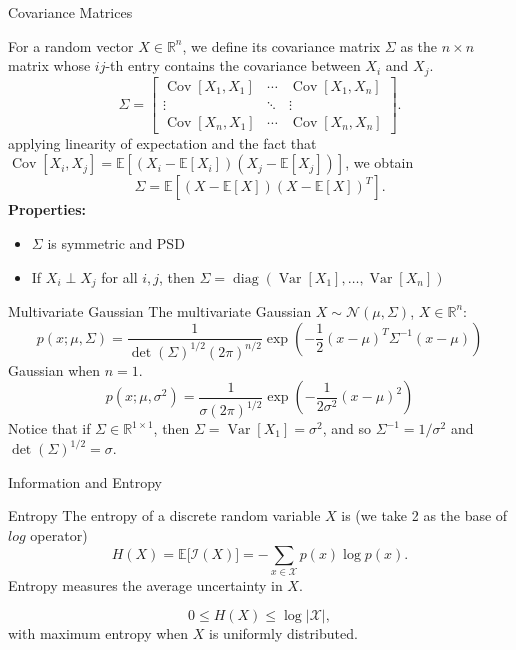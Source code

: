 \documentclass[aspectratio=169,12pt]{beamer}
\DeclareMathOperator{\diag}{diag}
\DeclareMathOperator{\Var}{Var}
\DeclareMathOperator{\Cov}{Cov}
\begin{document}
\begin{frame}[t]{Covariance Matrices}
  \vspace{-0.15cm}
  {\fontsize{8.8}{10.5}\selectfont
  For a random vector $X\in\mathbb{R}^{n}$, we define its covariance matrix
  $\Sigma$ as the $n\times n$ matrix whose $ij$-th entry contains the covariance
  between $X_i$ and $X_j$.
  \[
    \Sigma=
    \begin{bmatrix}
      \Cov[X_1,X_1]&\cdots&\Cov[X_1,X_n]\\
      \vdots&\ddots&\vdots\\
      \Cov[X_n,X_1]&\cdots&\Cov[X_n,X_n]
    \end{bmatrix}.
  \]
  applying linearity of expectation and the fact that
  $\Cov[X_i,X_j]=\mathbb{E}[(X_i-\mathbb{E}[X_i])(X_j-\mathbb{E}[X_j])]$, we
  obtain
  \[
    \Sigma=\mathbb{E}[(X-\mathbb{E}[X])(X-\mathbb{E}[X])^T].
  \]
  \textbf{Properties:}
  \begin{itemize}
    \setlength{\itemsep}{0.05cm}
    \item $\Sigma$ is symmetric and PSD
    \item If $X_i\perp X_j$ for all $i,j$, then
          $\Sigma=\diag(\Var[X_1],\ldots,\Var[X_n])$
  \end{itemize}
  }
\end{frame}



\begin{frame}[t]{Multivariate Gaussian}
  \vspace{0.1cm}
  {
  The multivariate Gaussian $X\sim\mathcal{N}(\mu,\Sigma)$, $X\in\mathbb{R}^{n}$:
  \[
    p(x;\mu,\Sigma)
    =\frac{1}{\det(\Sigma)^{1/2}(2\pi)^{n/2}}
      \exp\!\left(-\frac{1}{2}(x-\mu)^T\Sigma^{-1}(x-\mu)\right)
  \]
  Gaussian when $n=1$.
  \[
    p(x;\mu,\sigma^2)
    =\frac{1}{\sigma(2\pi)^{1/2}}
      \exp\!\left(-\frac{1}{2\sigma^2}(x-\mu)^2\right)
  \]
  Notice that if $\Sigma\in\mathbb{R}^{1\times1}$, then
  $\Sigma=\Var[X_1]=\sigma^2$, and so $\Sigma^{-1}=1/\sigma^2$ and
  $\det(\Sigma)^{1/2}=\sigma$.
  }
\end{frame}

\begin{frame}[t]{Information and Entropy}
	\vspace{0.2cm}
	
	
	
	\begin{block}{Entropy}
		The entropy of a discrete random variable $X$ is (we take 2 as the base of $log$ operator)
		\[
		H(X)
		=
		\mathbb{E}\bigl[\mathcal{I}(X)\bigr]
		=
		-\sum_{x\in\mathcal{X}}p(x)\log p(x).
		\]
		Entropy measures the average uncertainty in $X$.
	\end{block}
	

	
	\[
	0\leq H(X)\leq \log |\mathcal{X}|,
	\]
	with maximum entropy when $X$ is uniformly distributed.
\end{frame}
\end{document}
